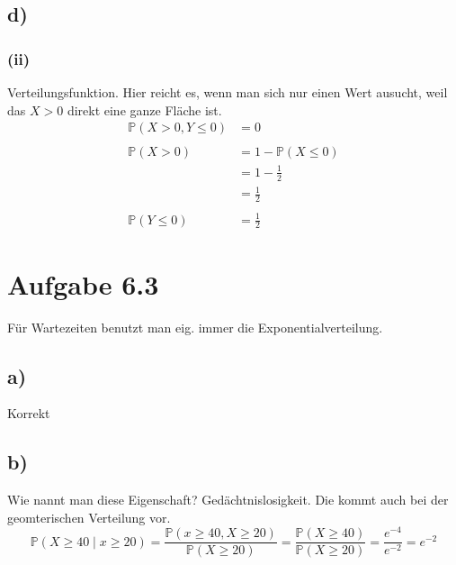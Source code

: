 \documentclass{article} %
\newcommand{\p}[0]{\mathbb{P}}
\begin{document}
\subsection*{d)}
\subsubsection*{(ii)}
Verteilungsfunktion. Hier reicht es, wenn man sich nur einen Wert ausucht, weil das $X > 0$ direkt eine ganze Fläche ist. 
\begin{align*}
    \p(X > 0, Y \leq 0) & = 0\\ \\
    \p (X>0) &= 1 - \p(X \leq 0) \\
    &= 1 - \frac{1}{2} \\
    &= \frac{1}{2} \\ \\
    \p(Y \leq 0) &= \frac{1}{2}
\end{align*}
\section{Aufgabe 6.3}
Für Wartezeiten benutzt man eig. immer die Exponentialverteilung. 
\subsection*{a)}
Korrekt
\subsection{b)}
Wie nannt man diese Eigenschaft? Gedächtnislosigkeit. Die kommt auch bei der geomterischen Verteilung vor.\\
\[
\p(X \geq 40 \mid x \geq  20) = \frac{\p(x \geq 40, X \geq 20)}{\p(X\geq 20)} = \frac{\p(X \geq 40)}{\p(X \geq 20)} = \frac{e^{-4}}{e^{-2}} = e^{-2}
\]
\end{document}
